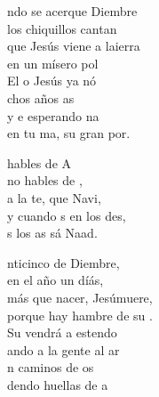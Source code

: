 \begin{cancion}%
	ndo se acerque Diembre\\
	los chiquillos cantan\\
	que Jesús viene a laierra\\
	en un mísero pol\\
	El o Jesús ya nó\\
	chos años as\\
	y e esperando na\\
	en tu ma, su gran por.\\
	\begin{chorus}%
	hables de A\\
	no hables de ,\\
	a la te, que  Navi,\\
	y cuando s en los des,\\
	s los as sá Naad.\\
	\end{chorus}%
	nticinco de Diembre,\\
	en el año un díás,\\
	más que nacer, Jesúmuere,\\
	porque hay hambre de su .\\
	Su vendrá a estendo\\
	ando a la gente al ar \\
	n caminos de os\\
	dendo huellas de a\\
\end{cancion}%
